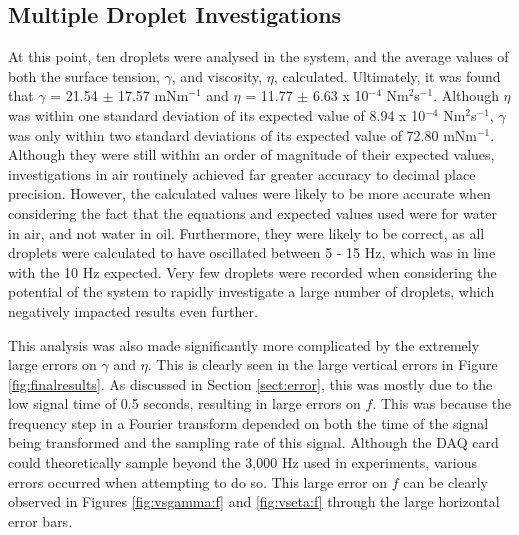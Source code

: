 \documentclass{physics_article_B}
\begin{document}
    \subsection{Multiple Droplet Investigations\label{sect:results:multi}}
    
        At this point, ten droplets were analysed in the system, and the average values of both the surface tension, $\gamma$, and viscosity, $\eta$, calculated. Ultimately, it was found that $\gamma$ = 21.54 $\pm$ 17.57 mNm$^{-1}$ and $\eta$ = 11.77 $\pm$ 6.63 x 10$^{-4}$ Nm$^{2}$s$^{-1}$. Although $\eta$ was within one standard deviation of its expected value\cite{expected2} of 8.94 x 10$^{-4}$ Nm$^{2}$s$^{-1}$, $\gamma$ was only within two standard deviations of its expected value\cite{expected1} of 72.80 mNm$^{-1}$. Although they were still within an order of magnitude of their expected values, investigations in air routinely achieved far greater accuracy to decimal place precision. However, the calculated values were likely to be more accurate when considering the fact that the equations and expected values used were for water in air, and not water in oil. Furthermore, they were likely to be correct, as all droplets were calculated to have oscillated between 5 - 15 Hz, which was in line with the 10 Hz expected. Very few droplets were recorded when considering the potential of the system to rapidly investigate a large number of droplets, which negatively impacted results even further.  
        
        This analysis was also made significantly more complicated by the extremely large errors on $\gamma$ and $\eta$. This is clearly seen in the large vertical errors in Figure \ref{fig:finalresults}. As discussed in Section \ref{sect:error}, this was mostly due to the low signal time of 0.5 seconds, resulting in large errors on $f$. This was because the frequency step in a Fourier transform depended on both the time of the signal being transformed and the sampling rate of this signal. Although the DAQ card could theoretically sample beyond the 3,000 Hz used in experiments, various errors occurred when attempting to do so. This large error on $f$ can be clearly observed in Figures \ref{fig:vsgamma:f} and \ref{fig:vseta:f} through the large horizontal error bars. 
    
\end{document}
